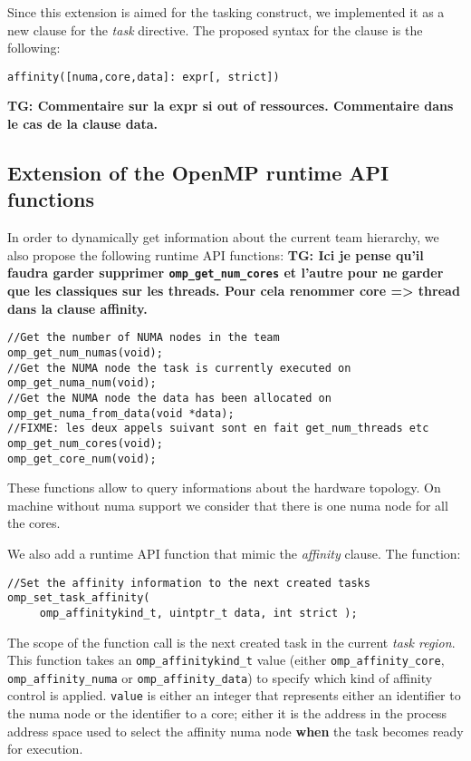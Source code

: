 \documentclass{Styles/llncs}
\newcommand{\TG}[1]{{\color{red}\bfseries TG: #1}}
\begin{document}
Since this extension is aimed for the tasking construct, we implemented it as a new
clause for the \emph{task} directive. The proposed syntax for the clause is the following:
\begin{lstlisting}
affinity([numa,core,data]: expr[, strict])
\end{lstlisting}

\TG{Commentaire sur la expr si out of ressources. Commentaire dans le cas de la clause data. } 

\subsection{Extension of the OpenMP runtime API functions}
In order to dynamically get information about the current team hierarchy, we also propose
the following runtime API functions:
\TG{Ici je pense qu'il faudra garder supprimer \texttt{omp\_get\_num\_cores} et l'autre pour ne garder
que les classiques sur les threads. Pour cela renommer core => thread dans la clause affinity.
}
\begin{lstlisting}
//Get the number of NUMA nodes in the team
omp_get_num_numas(void);
//Get the NUMA node the task is currently executed on
omp_get_numa_num(void);
//Get the NUMA node the data has been allocated on
omp_get_numa_from_data(void *data);
//FIXME: les deux appels suivant sont en fait get_num_threads etc
omp_get_num_cores(void);
omp_get_core_num(void);
\end{lstlisting}

These functions allow to query informations about the hardware topology. On machine without numa support we consider that there is one numa node for all the cores.

We also add a runtime API function that mimic the \textit{affinity} clause. The function:
\begin{lstlisting}
//Set the affinity information to the next created tasks
omp_set_task_affinity( 
     omp_affinitykind_t, uintptr_t data, int strict );
\end{lstlisting}
The scope of the function call is the next created task in the current \textit{task region}.
This function takes an \texttt{omp\_affinitykind\_t} value (either \texttt{omp\_affinity\_core}, \texttt{omp\_affinity\_numa} or \texttt{omp\_affinity\_data}) to specify which kind of affinity control is applied. \texttt{value} is either an integer that represents either an identifier to the numa node or the identifier to a core; either it is the address in the process address space used to select the affinity numa node \textbf{when} the task becomes ready for execution.
\end{document}
